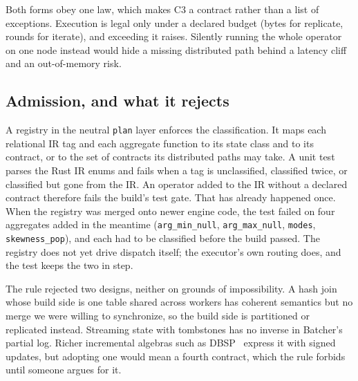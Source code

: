\documentclass[10pt,twocolumn,letterpaper]{article}   %
\newcommand{\sys}{Batcher}
\newcommand{\Cc}{\textsc{C3}}
\begin{document}
Both forms obey one law, which makes \Cc{} a contract rather than a list of exceptions.
Execution is legal only under a declared budget (bytes for replicate, rounds for iterate), and
exceeding it raises. Silently running the whole operator on one node instead would hide a
missing distributed path behind a latency cliff and an out-of-memory risk.

\subsection{Admission, and what it rejects}
\label{sec:admission}

A registry in the neutral \texttt{plan} layer enforces the classification. It maps each
relational IR tag and each aggregate function to its state class and to its contract, or
to the set of contracts its distributed paths may take. A unit test parses the Rust IR enums
and fails when a tag is unclassified, classified twice, or classified but gone from the IR. An
operator added to the IR without a declared contract therefore fails the build's test gate.
That has already happened once. When the registry was merged onto newer engine code, the test
failed on four aggregates added in the meantime (\texttt{arg\_min\_null},
\texttt{arg\_max\_null}, \texttt{modes}, \texttt{skewness\_pop}), and each had to be
classified before the build passed. The registry does not yet drive dispatch itself; the
executor's own routing does, and the test keeps the two in step.

The rule rejected two designs, neither on grounds of impossibility. A hash join whose build
side is one table shared across workers has coherent semantics but no merge we were willing
to synchronize, so the build side is partitioned or replicated instead. Streaming state with
tombstones has no inverse in \sys{}'s partial log. Richer incremental algebras such as
DBSP~\cite{budiu2023dbsp} express it with signed updates, but adopting one would mean a fourth
contract, which the rule forbids until someone argues for it.
\end{document}
